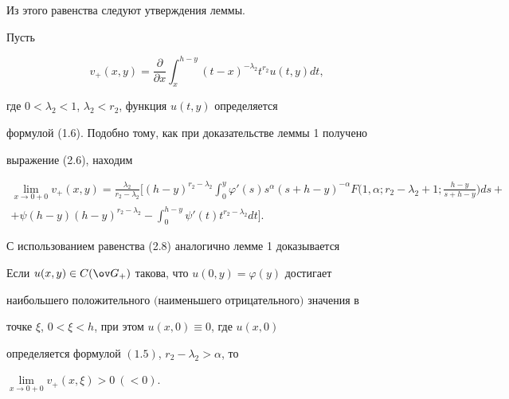  


Из этого равенства следуют утверждения леммы. 


 


Пусть 


$$ 


v_+(x,y)=\frac{\partial}{\partial x}\int^{h-y}_x 


(t-x)^{-\lambda_2}t^{r_2}u(t,y)d t, 


$$ 


где $0<\lambda_2<1$, $\lambda_2<r_2$, функция $u(t,y)$ определяется 


формулой (1.6). Подобно тому, как при доказательстве леммы 1 получено 


выражение (2.6), находим 


\begin{multline} 


\lim_{x\to0+0}v_+(x,y)=\frac{\lambda_2}{r_2-\lambda_2}\bigg[ 


(h-y)^{r_2-\lambda_2}\int^y_0 \varphi'(s)s^\alpha 


(s+h-y)^{-\alpha}F\bigg(1,\alpha;r_2-\lambda_2+1;\frac{h-y}{s+h-y} 


\bigg)d s +\\ 


% 


+\psi(h-y)(h-y)^{r_2-\lambda_2}-\int^{h-y}_0 \psi'(t) 


t^{r_2-\lambda_2}d t\bigg]. 


\end{multline} 


 


С использованием равенства (2.8) аналогично лемме 1 доказывается 


 


\begin{lem} 


Если $u(x,y)\in C(\ov G_+)$ такова, что $u(0,y)=\varphi(y)$ достигает 


наибольшего положительного $($наименьшего отрицательного$)$ значения в 


точке $\xi$, $0<\xi<h$, при этом $u(x,0)\equiv0$, где $u(x,0)$ 


определяется формулой $(1.5)$, $r_2-\lambda_2>\alpha$, то 


$\lim\limits_{x\to0+0}v_+(x,\xi)>0\ (<0)$. 


\end{lem} 


